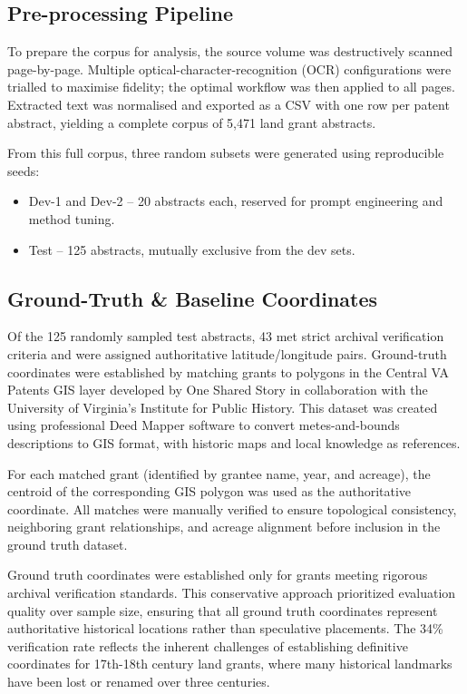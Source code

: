 \subsection{Pre-processing Pipeline}\label{pre-processing-pipeline}

To prepare the corpus for analysis, the source volume was destructively
scanned page-by-page. Multiple optical-character-recognition (OCR)
configurations were trialled to maximise fidelity; the optimal workflow
was then applied to all pages. Extracted text was normalised and
exported as a CSV with one row per patent abstract, yielding a complete
corpus of 5,471 land grant abstracts.

From this full corpus, three random subsets were generated using
reproducible seeds:

\begin{itemize}
\tightlist
\item
  Dev-1 and Dev-2 -- 20 abstracts each, reserved for prompt engineering
  and method tuning.
\item
  Test -- 125 abstracts, mutually exclusive from the dev sets.
\end{itemize}

\subsection{Ground-Truth \& Baseline
Coordinates}\label{ground-truth-baseline-coordinates}

Of the 125 randomly sampled test abstracts, 43 met strict archival
verification criteria and were assigned authoritative latitude/longitude
pairs. Ground-truth coordinates were established by matching grants to
polygons in the Central VA Patents GIS layer developed by One Shared
Story \citep{central_va_patents_gis} in collaboration with the
University of Virginia's Institute for Public History. This dataset was
created using professional Deed Mapper software to convert
metes-and-bounds descriptions to GIS format, with historic maps and
local knowledge as references.

For each matched grant (identified by grantee name, year, and acreage),
the centroid of the corresponding GIS polygon was used as the
authoritative coordinate. All matches were manually verified to ensure
topological consistency, neighboring grant relationships, and acreage
alignment before inclusion in the ground truth dataset.

Ground truth coordinates were established only for grants meeting
rigorous archival verification standards. This conservative approach
prioritized evaluation quality over sample size, ensuring that all
ground truth coordinates represent authoritative historical locations
rather than speculative placements. The 34\% verification rate reflects
the inherent challenges of establishing definitive coordinates for
17th-18th century land grants, where many historical landmarks have been
lost or renamed over three centuries.

